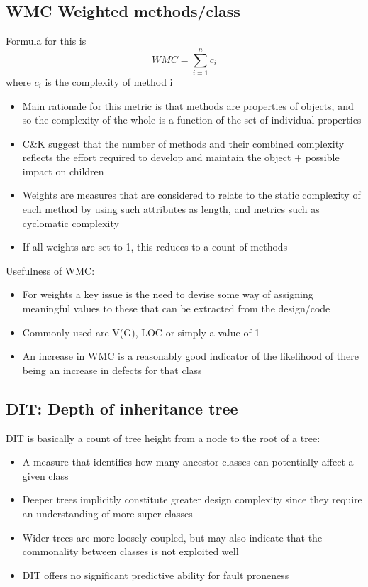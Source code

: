 \documentclass{article}[18pt]
\begin{document}
\subsection{WMC Weighted methods/class}
Formula for this is
$$WMC=\sum_{i=1}^{n}c_i$$
where $c_i$ is the complexity of method i
\begin{itemize}
	\item Main rationale for this metric is that methods are properties of objects, and so the complexity of the whole is a function of the set of individual properties
	\item C\&K suggest that the number of methods and their combined complexity reflects the effort required to develop and maintain the object + possible impact on children
	\item Weights are measures that are considered to relate to the static complexity of each method by using such attributes as length, and metrics such as cyclomatic complexity
	\item If all weights are set to 1, this reduces to a count of methods
\end{itemize}
Usefulness of WMC:
\begin{itemize}
	\item For weights a key issue is the need to devise some way of assigning meaningful values to these that can be extracted from the design/code
	\item Commonly used are V(G), LOC or simply a value of 1
	\item An increase in WMC is a reasonably good indicator of the likelihood of there being an increase in defects for that class
\end{itemize}
\subsection{DIT: Depth of inheritance tree}
DIT is basically a count of tree height from a node to the root of a tree:
\begin{itemize}
	\item A measure that identifies how many ancestor classes can potentially affect a given class
	\item Deeper trees implicitly constitute greater design complexity since they require an understanding of more super-classes
	\item Wider trees are more loosely coupled, but may also indicate that the commonality between classes is not exploited well
	\item DIT offers no significant predictive ability for fault proneness
\end{itemize}
\end{document}
